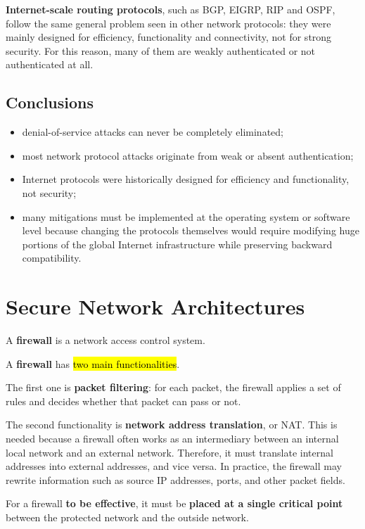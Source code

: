 \documentclass{article}
\begin{document}
\textbf{Internet-scale routing protocols}, such as BGP, EIGRP, RIP and OSPF,
follow the same general problem seen in other network protocols: they
were mainly designed for efficiency, functionality and connectivity, not
for strong security. For this reason, many of them are weakly
authenticated or not authenticated at all.

\subsection{Conclusions}

\begin{itemize}
\item denial-of-service attacks can never be completely eliminated;
\item most network protocol attacks originate from weak or absent
    authentication;
\item Internet protocols were historically designed for efficiency and
    functionality, not security;
\item many mitigations must be implemented at the operating system or
    software level because changing the protocols themselves would
    require modifying huge portions of the global Internet
    infrastructure while preserving backward compatibility.
\end{itemize}

\section{Secure Network Architectures}

A \textbf{firewall} is a network access control system.

A \textbf{firewall} has \hl{two main functionalities}.

The first one is \textbf{packet filtering}: for each packet, the firewall
applies a set of rules and decides whether that packet can pass or not.

The second functionality is \textbf{network address translation}, or NAT.
This is needed because a firewall often works as an intermediary between
an internal local network and an external network. Therefore, it must
translate internal addresses into external addresses, and vice versa. In
practice, the firewall may rewrite information such as source IP
addresses, ports, and other packet fields.

For a firewall \textbf{to be effective}, it must be \textbf{placed at a single
critical point} between the protected network and the outside network.
\end{document}
